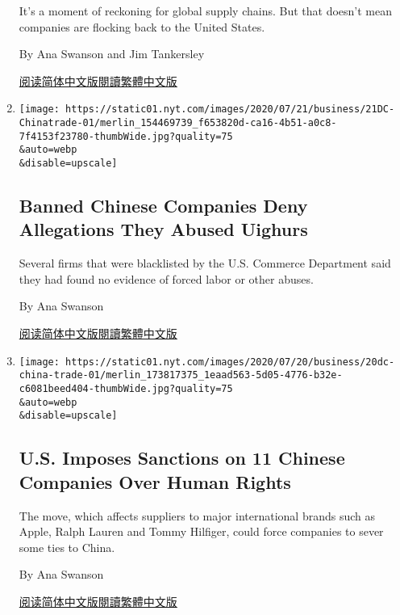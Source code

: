 \begin{enumerate}
  It's a moment of reckoning for global supply chains. But that doesn't
  mean companies are flocking back to the United States.

  By Ana Swanson and Jim Tankersley

  \href{https://cn.nytimes.com/business/20200723/coronavirus-globalization-jobs-supply-chain-china/}{阅读简体中文版}\href{https://cn.nytimes.com/business/20200723/coronavirus-globalization-jobs-supply-chain-china/zh-hant/}{閱讀繁體中文版}
\item
  \href{/2020/07/21/business/china-us-trade-banned.html}{}

  \texttt{[image: https://static01.nyt.com/images/2020/07/21/business/21DC-Chinatrade-01/merlin\_154469739\_f653820d-ca16-4b51-a0c8-7f4153f23780-thumbWide.jpg?quality=75\\\&auto=webp\\\&disable=upscale]}

  \hypertarget{banned-chinese-companies-deny-allegations-they-abused-uighurs}{%
  \subsection{Banned Chinese Companies Deny Allegations They Abused
  Uighurs}\label{banned-chinese-companies-deny-allegations-they-abused-uighurs}}

  Several firms that were blacklisted by the U.S. Commerce Department
  said they had found no evidence of forced labor or other abuses.

  By Ana Swanson

  \href{https://cn.nytimes.com/business/20200722/china-us-trade-banned/}{阅读简体中文版}\href{https://cn.nytimes.com/business/20200722/china-us-trade-banned/zh-h}{閱讀繁體中文版}
\item
  \href{/2020/07/20/business/economy/china-sanctions-uighurs-labor.html}{}

  \texttt{[image: https://static01.nyt.com/images/2020/07/20/business/20dc-china-trade-01/merlin\_173817375\_1eaad563-5d05-4776-b32e-c6081beed404-thumbWide.jpg?quality=75\\\&auto=webp\\\&disable=upscale]}

  \hypertarget{us-imposes-sanctions-on-11-chinese-companies-over-human-rights}{%
  \subsection{U.S. Imposes Sanctions on 11 Chinese Companies Over Human
  Rights}\label{us-imposes-sanctions-on-11-chinese-companies-over-human-rights}}

  The move, which affects suppliers to major international brands such
  as Apple, Ralph Lauren and Tommy Hilfiger, could force companies to
  sever some ties to China.

  By Ana Swanson

  \href{https://cn.nytimes.com/business/20200721/china-sanctions-uighurs-labor/}{阅读简体中文版}\href{https://cn.nytimes.com/business/20200721/china-sanctions-uighurs-labor/zh-}{閱讀繁體中文版}
\end{enumerate}

